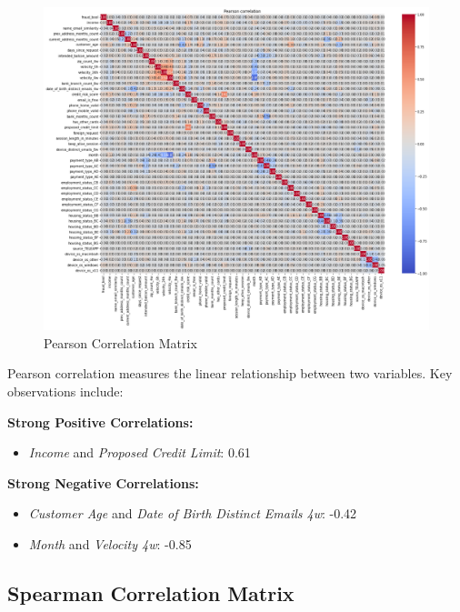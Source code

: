 \documentclass[12pt,a4paper]{report}
\begin{document}
\begin{figure}[h]
    \centering
    \includegraphics[width=\textwidth]{pearson_corr.png}
    \caption{Pearson Correlation Matrix}
    \label{fig:pearson_corr}
\end{figure}

Pearson correlation measures the linear relationship between two variables. Key observations include:

\textbf{Strong Positive Correlations:}
\begin{itemize}
    \item \textit{Income} and \textit{Proposed Credit Limit}: 0.61
\end{itemize}

\textbf{Strong Negative Correlations:}
\begin{itemize}
    \item \textit{Customer Age} and \textit{Date of Birth Distinct Emails 4w}: -0.42
    \item \textit{Month} and \textit{Velocity 4w}: -0.85
\end{itemize}

\subsection{Spearman Correlation Matrix}
\end{document}
